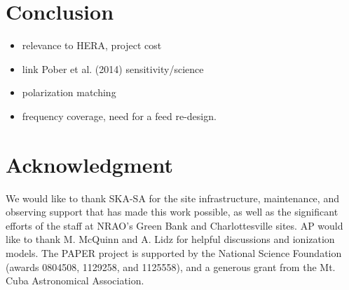 \documentclass[preprint]{aastex}  %
\begin{document}
\section{Conclusion}
\label{sec:conclusion}

\begin{itemize}
\item relevance to HERA, project cost
\item link Pober et al. (2014) sensitivity/science
\item polarization matching
\item frequency coverage, need for a feed re-design.
\end{itemize}

\section{Acknowledgment}

We would like to thank SKA-SA for the site infrastructure, maintenance, and observing support
that has made this work possible, as well as the significant efforts of the staff at
NRAO's Green Bank and Charlottesville sites.  AP would like to thank M. McQuinn and A. Lidz
for helpful discussions and ionization models.
The PAPER project is supported
by the National Science Foundation (awards 0804508,
1129258, and 1125558), and a generous grant
from the Mt. Cuba Astronomical Association.




\end{document}
